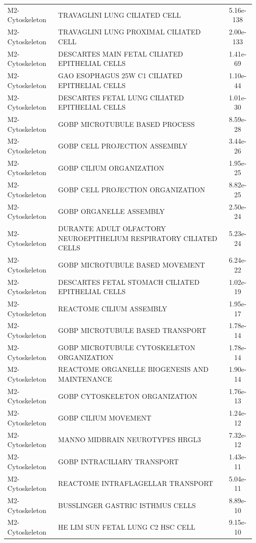 \documentclass[
]{article}
\begin{document}
\begin{singlespace}
\begin{longtable}[t]{>{\raggedright\arraybackslash}p{1.4in}>{\raggedright\arraybackslash}p{4.5in}c}
\endfoot
\bottomrule
\endlastfoot
M2-Cytoskeleton & TRAVAGLINI LUNG CILIATED CELL & 5.16e-138\\
M2-Cytoskeleton & TRAVAGLINI LUNG PROXIMAL CILIATED CELL & 2.00e-133\\
M2-Cytoskeleton & DESCARTES MAIN FETAL CILIATED EPITHELIAL CELLS & 1.41e-69\\
M2-Cytoskeleton & GAO ESOPHAGUS 25W C1 CILIATED EPITHELIAL CELLS & 1.10e-44\\
M2-Cytoskeleton & DESCARTES FETAL LUNG CILIATED EPITHELIAL CELLS & 1.01e-30\\
\addlinespace
M2-Cytoskeleton & GOBP MICROTUBULE BASED PROCESS & 8.59e-28\\
M2-Cytoskeleton & GOBP CELL PROJECTION ASSEMBLY & 3.44e-26\\
M2-Cytoskeleton & GOBP CILIUM ORGANIZATION & 1.95e-25\\
M2-Cytoskeleton & GOBP CELL PROJECTION ORGANIZATION & 8.82e-25\\
M2-Cytoskeleton & GOBP ORGANELLE ASSEMBLY & 2.50e-24\\
\addlinespace
M2-Cytoskeleton & DURANTE ADULT OLFACTORY NEUROEPITHELIUM RESPIRATORY CILIATED CELLS & 5.23e-24\\
M2-Cytoskeleton & GOBP MICROTUBULE BASED MOVEMENT & 6.24e-22\\
M2-Cytoskeleton & DESCARTES FETAL STOMACH CILIATED EPITHELIAL CELLS & 1.02e-19\\
M2-Cytoskeleton & REACTOME CILIUM ASSEMBLY & 1.95e-17\\
M2-Cytoskeleton & GOBP MICROTUBULE BASED TRANSPORT & 1.78e-14\\
\addlinespace
M2-Cytoskeleton & GOBP MICROTUBULE CYTOSKELETON ORGANIZATION & 1.78e-14\\
M2-Cytoskeleton & REACTOME ORGANELLE BIOGENESIS AND MAINTENANCE & 1.90e-14\\
M2-Cytoskeleton & GOBP CYTOSKELETON ORGANIZATION & 1.76e-13\\
M2-Cytoskeleton & GOBP CILIUM MOVEMENT & 1.24e-12\\
M2-Cytoskeleton & MANNO MIDBRAIN NEUROTYPES HRGL3 & 7.32e-12\\
\addlinespace
M2-Cytoskeleton & GOBP INTRACILIARY TRANSPORT & 1.43e-11\\
M2-Cytoskeleton & REACTOME INTRAFLAGELLAR TRANSPORT & 5.04e-11\\
M2-Cytoskeleton & BUSSLINGER GASTRIC ISTHMUS CELLS & 8.89e-10\\
M2-Cytoskeleton & HE LIM SUN FETAL LUNG C2 HSC CELL & 9.15e-10\\

\end{longtable}
\end{singlespace}
\end{document}

